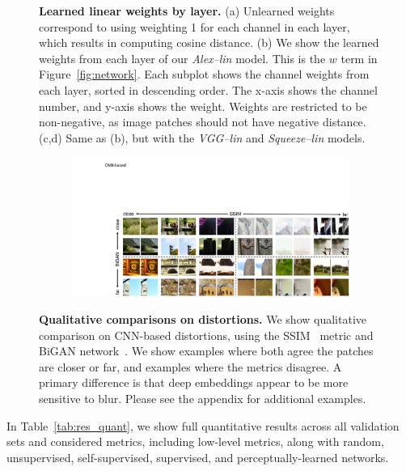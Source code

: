 \begin{figure}
\vspace{-2mm}
\caption{\textbf{Learned linear weights by layer.} (a) Unlearned weights correspond to using weighting 1 for each channel in each layer, which results in computing cosine distance. (b) We show the learned weights from each layer of our \textit{Alex--lin} model. This is the $w$ term in Figure~\ref{fig:network}. Each subplot shows the channel weights from each layer, sorted in descending order. The x-axis shows the channel number, and y-axis shows the weight. Weights are restricted to be non-negative, as image patches should not have negative distance. (c,d) Same as (b), but with the \textit{VGG--lin} and \textit{Squeeze--lin} models.}
\label{fig:weights}
\vspace{-4mm}
\end{figure}

\begin{figure}
\centering
\begin{subfigure}{1.\textwidth}
  \includegraphics[width=1.\linewidth]{imgs/fig_comp_high.pdf}
\end{subfigure}
\vspace{-2mm}
\caption{\textbf{Qualitative comparisons on distortions.} We show qualitative comparison on CNN-based distortions, using the SSIM~\cite{wang2004image} metric and BiGAN network~\cite{donahue2016adversarial}. We show examples where both agree the patches are closer or far, and examples where the metrics disagree. A primary difference is that deep embeddings appear to be more sensitive to blur. Please see the appendix for additional examples.}
\label{fig:qual_comp}
\vspace{-4mm}
\end{figure}

In Table~\ref{tab:res_quant}, we show full quantitative results across all validation sets and considered metrics, including low-level metrics, along with random, unsupervised, self-supervised, supervised, and perceptually-learned networks.

